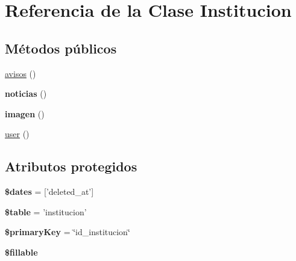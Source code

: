 \hypertarget{class_app_1_1_institucion}{\section{\-Referencia de la \-Clase \-Institucion}
\label{class_app_1_1_institucion}
}
\subsection*{\-Métodos públicos}
\begin{DoxyCompactItemize}
\item 
\hyperlink{class_app_1_1_institucion_ade152cc7eb49d82f41821a9219c4268f}{avisos} ()
\item 
\hypertarget{class_app_1_1_institucion_a839cc211520cee7e68f28fe9c6f08a56}{{\bfseries noticias} ()}\label{class_app_1_1_institucion_a839cc211520cee7e68f28fe9c6f08a56}

\item 
\hypertarget{class_app_1_1_institucion_a5dc675056de3625bba3841341313ff72}{{\bfseries imagen} ()}\label{class_app_1_1_institucion_a5dc675056de3625bba3841341313ff72}

\item 
\hyperlink{class_app_1_1_institucion_ae8a275690ff1b618e1947378b0ed73ae}{user} ()
\end{DoxyCompactItemize}
\subsection*{\-Atributos protegidos}
\begin{DoxyCompactItemize}
\item 
\hypertarget{class_app_1_1_institucion_aab581066837d6296ba35c72937b6fc1c}{{\bfseries \$dates} = \mbox{[}'deleted\-\_\-at'\mbox{]}}\label{class_app_1_1_institucion_aab581066837d6296ba35c72937b6fc1c}

\item 
\hypertarget{class_app_1_1_institucion_ae8876a14058f368335baccf35af4a22b}{{\bfseries \$table} = 'institucion'}\label{class_app_1_1_institucion_ae8876a14058f368335baccf35af4a22b}

\item 
\hypertarget{class_app_1_1_institucion_a927b0256b942a3ee89485f2649af7981}{{\bfseries \$primary\-Key} = \char`\"{}id\-\_\-institucion\char`\"{}}\label{class_app_1_1_institucion_a927b0256b942a3ee89485f2649af7981}

\item 
{\bfseries \$fillable}
\end{DoxyCompactItemize}


